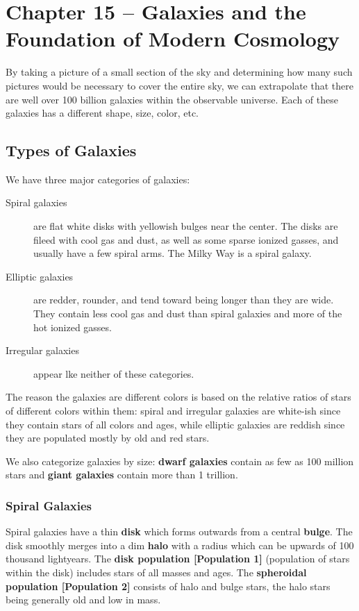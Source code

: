 \section{Chapter 15 -- Galaxies and the Foundation of Modern Cosmology}
By taking a picture of a small section of the sky and determining how many such pictures would be necessary to cover the entire sky, we can extrapolate that there are well over 100 billion galaxies within the observable universe. Each of these galaxies has a different shape, size, color, etc.

\subsection{Types of Galaxies}
We have three major categories of galaxies:
\begin{description}
\item[Spiral galaxies] are flat white disks with yellowish bulges near the center. The disks are fileed with cool gas and dust, as well as some sparse ionized gasses, and usually have a few spiral arms. The Milky Way is a spiral galaxy.
\item[Elliptic galaxies] are redder, rounder, and tend toward being longer than they are wide. They contain less cool gas and dust than spiral galaxies and more of the hot ionized gasses.
\item[Irregular galaxies] appear lke neither of these categories.
\end{description}

The reason the galaxies are different colors is based on the relative ratios of stars of different colors within them: spiral and irregular galaxies are white-ish since they contain stars of all colors and ages, while elliptic galaxies are reddish since they are populated mostly by old and red stars.

We also categorize galaxies by size: {\bf dwarf galaxies} contain as few as 100 million stars and {\bf giant galaxies} contain more than 1 trillion.

\subsubsection{Spiral Galaxies}
Spiral galaxies have a thin {\bf disk} which forms outwards from a central {\bf bulge}. The disk smoothly merges into a dim {\bf halo} with a radius which can be upwards of 100 thousand lightyears. The {\bf disk population [Population 1]} (population of stars within the disk) includes stars of all masses and ages. The {\bf spheroidal population [Population 2]} consists of halo and bulge stars, the halo stars being generally old and low in mass.

